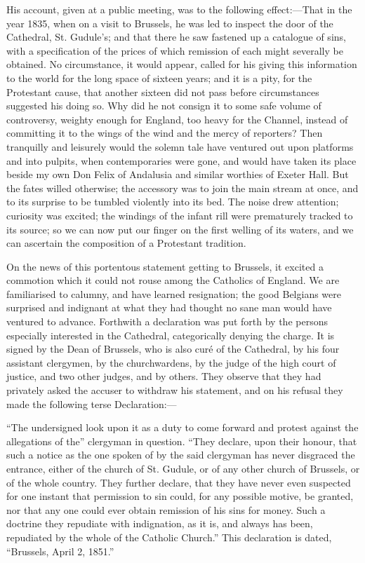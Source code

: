 His account, given at a public meeting, was to the
following effect:—That in the year 1835, when on a
visit to Brussels, he was led to inspect the door of the
Cathedral, St. Gudule's; and that there he saw fastened
up a catalogue of sins, with a specification of the
prices of which remission of each might severally be
obtained. No circumstance, it would appear, called for
his giving this information to the world for the long
space of sixteen years; and it is a pity, for the
Protestant cause, that another sixteen did not pass
before circumstances suggested his doing so. Why did he
not consign it to some safe volume of controversy,
weighty enough for England, too heavy for the Channel,
instead of committing it to the wings of the wind and the
mercy of reporters? Then tranquilly and leisurely would
the solemn tale have ventured out upon platforms and into
pulpits, when contemporaries were gone, and would have
taken its place beside my own Don Felix of Andalusia and
similar worthies of Exeter Hall. But the fates willed
otherwise; the accessory was to join the main stream at
once, and to its surprise to be tumbled violently into
its bed. The noise drew attention; curiosity was excited;
the windings of the infant rill were prematurely tracked
to its source; so we can now put our finger on the first
welling of its waters, and we can ascertain the
composition of a Protestant tradition.

On the news of this portentous statement getting to
Brussels, it excited a commotion which it could not rouse
among the Catholics of England. We are familiarised to
calumny, and have learned resignation; the good Belgians
were surprised and indignant at what they had thought no
sane man would have ventured to advance. Forthwith a
declaration was put forth by the persons especially
interested in the Cathedral, categorically denying the
charge. It is signed by the Dean of Brussels, who is also
curé of the Cathedral, by his four assistant clergymen,
by the churchwardens, by the judge of the high court of
justice, and two other judges, and by others. They
observe that they had privately asked the accuser to
withdraw his statement, and on his refusal they made the
following terse Declaration:—

``The undersigned look upon it as a duty to come
forward and protest against the allegations of the''
clergyman in question. ``They declare, upon their
honour, that such a notice as the one spoken of by the
said clergyman has never disgraced the entrance, either
of the church of St. Gudule, or of any other church of
Brussels, or of the whole country. They further declare,
that they have never even suspected for one instant that
permission to sin could, for any possible motive, be
granted, nor that any one could ever obtain remission of
his sins for money. Such a doctrine they repudiate with
indignation, as it is, and always has been, repudiated by
the whole of the Catholic Church.'' This declaration
is dated, ``Brussels, April 2, 1851.''

